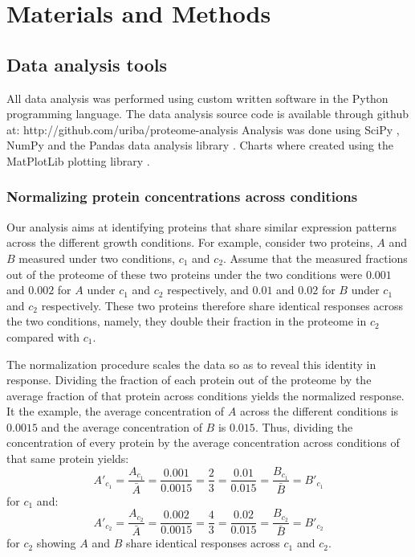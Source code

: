 \documentclass[a4paper]{article}
\begin{document}
\section{Materials and Methods}
\subsection{Data analysis tools}
All data analysis was performed using custom written software in the Python programming language.
The data analysis source code is available through github at: http://github.com/uriba/proteome-analysis
Analysis was done using SciPy \cite{Oliphant2007}, NumPy \cite{Community2011} and the Pandas data analysis library \cite{McKinney2011}.
Charts where created using the MatPlotLib plotting library \cite{Hunter2007}.

\subsubsection{Normalizing protein concentrations across conditions}
\label{concacrossconds} 
Our analysis aims at identifying proteins that share similar expression patterns across the different growth conditions.
For example, consider two proteins, $A$ and $B$ measured under two conditions, $c_1$ and $c_2$.
Assume that the measured fractions out of the proteome of these two proteins under the two conditions were $0.001$ and $0.002$ for $A$ under $c_1$ and $c_2$ respectively, and $0.01$ and $0.02$ for $B$ under $c_1$ and $c_2$ respectively.
These two proteins therefore share identical responses across the two conditions, namely, they double their fraction in the proteome in $c_2$ compared with $c_1$.

The normalization procedure scales the data so as to reveal this identity in response.
Dividing the fraction of each protein out of the proteome by the average fraction of that protein across conditions yields the normalized response.
It the example, the average concentration of $A$ across the different conditions is $0.0015$ and the average concentration of $B$ is $0.015$.
Thus, dividing the concentration of every protein by the average concentration across conditions of that same protein yields:
\[
A'_{c_1}=\frac{A_{c_1}}{\bar{A}}=\frac{0.001}{0.0015}=\frac{2}{3}=\frac{0.01}{0.015}=\frac{B_{c_1}}{\bar{B}}=B'_{c_1}
\]
for $c_1$ and:
\[
A'_{c_2}=\frac{A_{c_2}}{\bar{A}}=\frac{0.002}{0.0015}=\frac{4}{3}=\frac{0.02}{0.015}=\frac{B_{c_2}}{\bar{B}}=B'_{c_2}
\]
for $c_2$ showing $A$ and $B$ share identical responses across $c_1$ and $c_2$.
\end{document}

